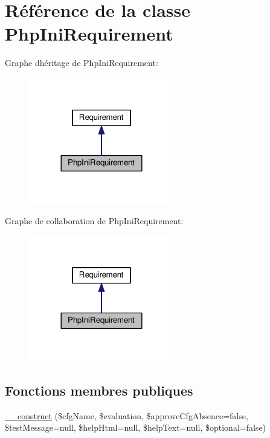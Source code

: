 \hypertarget{classPhpIniRequirement}{}\section{Référence de la classe Php\+Ini\+Requirement}
\label{classPhpIniRequirement}


Graphe d\textquotesingle{}héritage de Php\+Ini\+Requirement\+:\nopagebreak
\begin{figure}[H]
\begin{center}
\leavevmode
\includegraphics[width=180pt]{classPhpIniRequirement__inherit__graph}
\end{center}
\end{figure}


Graphe de collaboration de Php\+Ini\+Requirement\+:\nopagebreak
\begin{figure}[H]
\begin{center}
\leavevmode
\includegraphics[width=180pt]{classPhpIniRequirement__coll__graph}
\end{center}
\end{figure}
\subsection*{Fonctions membres publiques}
\begin{DoxyCompactItemize}
\item 
\hyperlink{classPhpIniRequirement_af3e88e1bbec416c36ed54c88ca1397bb}{\+\_\+\+\_\+construct} (\$cfg\+Name, \$evaluation, \$approve\+Cfg\+Absence=false, \$test\+Message=null, \$help\+Html=null, \$help\+Text=null, \$optional=false)
\end{DoxyCompactItemize}


